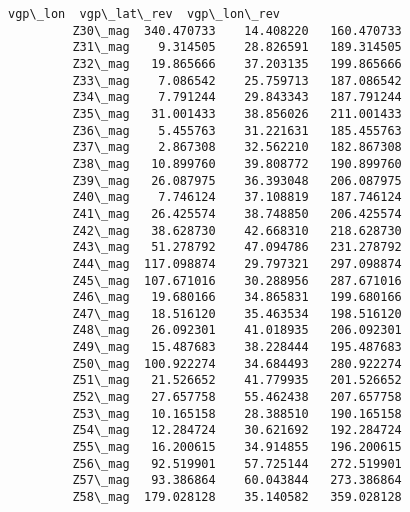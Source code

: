 \documentclass[11pt]{article}
\begin{document}
\begin{Verbatim}[commandchars=\\\{\}]
                     vgp\_lon  vgp\_lat\_rev  vgp\_lon\_rev  
         Z30\_mag  340.470733    14.408220   160.470733  
         Z31\_mag    9.314505    28.826591   189.314505  
         Z32\_mag   19.865666    37.203135   199.865666  
         Z33\_mag    7.086542    25.759713   187.086542  
         Z34\_mag    7.791244    29.843343   187.791244  
         Z35\_mag   31.001433    38.856026   211.001433  
         Z36\_mag    5.455763    31.221631   185.455763  
         Z37\_mag    2.867308    32.562210   182.867308  
         Z38\_mag   10.899760    39.808772   190.899760  
         Z39\_mag   26.087975    36.393048   206.087975  
         Z40\_mag    7.746124    37.108819   187.746124  
         Z41\_mag   26.425574    38.748850   206.425574  
         Z42\_mag   38.628730    42.668310   218.628730  
         Z43\_mag   51.278792    47.094786   231.278792  
         Z44\_mag  117.098874    29.797321   297.098874  
         Z45\_mag  107.671016    30.288956   287.671016  
         Z46\_mag   19.680166    34.865831   199.680166  
         Z47\_mag   18.516120    35.463534   198.516120  
         Z48\_mag   26.092301    41.018935   206.092301  
         Z49\_mag   15.487683    38.228444   195.487683  
         Z50\_mag  100.922274    34.684493   280.922274  
         Z51\_mag   21.526652    41.779935   201.526652  
         Z52\_mag   27.657758    55.462438   207.657758  
         Z53\_mag   10.165158    28.388510   190.165158  
         Z54\_mag   12.284724    30.621692   192.284724  
         Z55\_mag   16.200615    34.914855   196.200615  
         Z56\_mag   92.519901    57.725144   272.519901  
         Z57\_mag   93.386864    60.043844   273.386864  
         Z58\_mag  179.028128    35.140582   359.028128  
\end{Verbatim}
        

    \begin{center}
    \end{center}
    { \hspace*{\fill} \\}
    

    \begin{center}
    \end{center}
    { \hspace*{\fill} \\}
    
\end{document}
